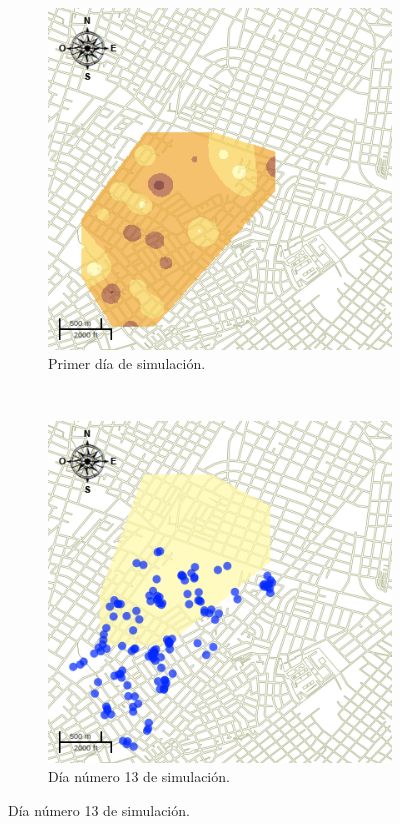\begin{figure}[!htbp]
    \centering
    \begin{subfigure}[b]{0.45\textwidth}
            \includegraphics[width=\textwidth]{capitulo-6/graphics/raster/temp-27-0.png}
            \caption{\label{fig:niveles-infestacion-27-a}Primer día de simulación.}
    \end{subfigure}
    ~~
    \begin{subfigure}[b]{0.45\textwidth}
            \includegraphics[width=\textwidth]{capitulo-6/graphics/raster/temp-27-12.png}
            \caption{\label{fig:niveles-infestacion-27-b}Día número 13 de simulación.}
    \end{subfigure}


\end{figure}
